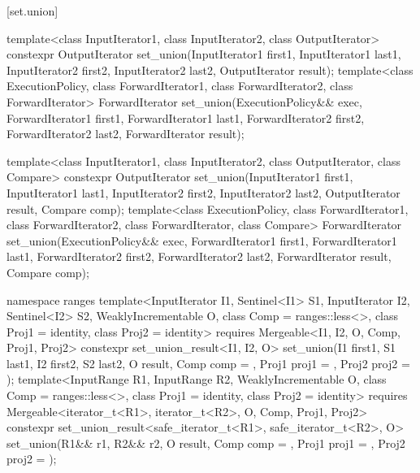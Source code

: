 [set.union]{}

%
\begin{itemdecl}
template<class InputIterator1, class InputIterator2,
         class OutputIterator>
  constexpr OutputIterator
    set_union(InputIterator1 first1, InputIterator1 last1,
              InputIterator2 first2, InputIterator2 last2,
              OutputIterator result);
template<class ExecutionPolicy, class ForwardIterator1, class ForwardIterator2,
         class ForwardIterator>
  ForwardIterator
    set_union(ExecutionPolicy&& exec,
              ForwardIterator1 first1, ForwardIterator1 last1,
              ForwardIterator2 first2, ForwardIterator2 last2,
              ForwardIterator result);

template<class InputIterator1, class InputIterator2,
         class OutputIterator, class Compare>
  constexpr OutputIterator
    set_union(InputIterator1 first1, InputIterator1 last1,
              InputIterator2 first2, InputIterator2 last2,
              OutputIterator result, Compare comp);
template<class ExecutionPolicy, class ForwardIterator1, class ForwardIterator2,
         class ForwardIterator, class Compare>
  ForwardIterator
    set_union(ExecutionPolicy&& exec,
              ForwardIterator1 first1, ForwardIterator1 last1,
              ForwardIterator2 first2, ForwardIterator2 last2,
              ForwardIterator result, Compare comp);

namespace ranges {
  template<InputIterator I1, Sentinel<I1> S1, InputIterator I2, Sentinel<I2> S2,
      WeaklyIncrementable O, class Comp = ranges::less<>, class Proj1 = identity, class Proj2 = identity>
    requires Mergeable<I1, I2, O, Comp, Proj1, Proj2>
    constexpr set_union_result<I1, I2, O>
      set_union(I1 first1, S1 last1, I2 first2, S2 last2, O result, Comp comp = {},
                Proj1 proj1 = {}, Proj2 proj2 = {});
  template<InputRange R1, InputRange R2, WeaklyIncrementable O,
      class Comp = ranges::less<>, class Proj1 = identity, class Proj2 = identity>
    requires Mergeable<iterator_t<R1>, iterator_t<R2>, O, Comp, Proj1, Proj2>
    constexpr set_union_result<safe_iterator_t<R1>, safe_iterator_t<R2>, O>
      set_union(R1&& r1, R2&& r2, O result, Comp comp = {},
                Proj1 proj1 = {}, Proj2 proj2 = {});
}
\end{itemdecl}

